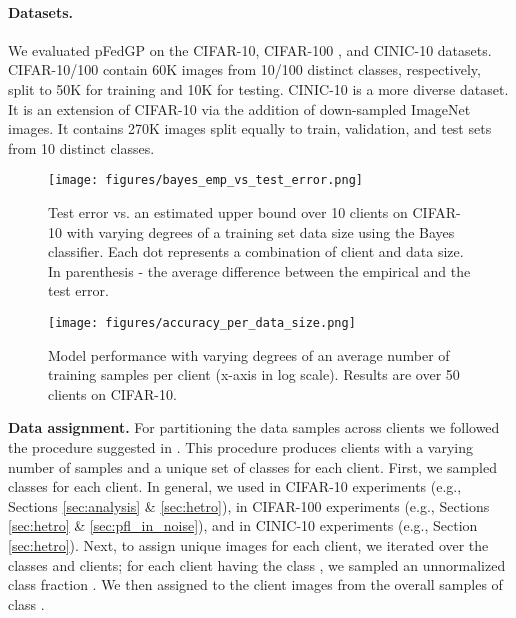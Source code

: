 \documentclass{article}
\begin{document}
\paragraph{Datasets.} We evaluated pFedGP on the CIFAR-10, CIFAR-100 \cite{krizhevsky2009learning}, and CINIC-10 \cite{darlow2018cinic} datasets. CIFAR-10/100 contain 60K images from 10/100 distinct classes, respectively, split to 50K for training and 10K for testing. CINIC-10 is a more diverse dataset. It is an extension of CIFAR-10 via the addition of down-sampled ImageNet \cite{deng2009imagenet} images. It contains 270K images split equally to train, validation, and test sets from 10 distinct classes.
\begin{figure}[!t]
    \centering
    \begin{minipage}{.45\textwidth}
        \centering
        \texttt{[image: figures/bayes\_emp\_vs\_test\_error.png]}
        \caption{Test error vs. an estimated upper bound over 10 clients on CIFAR-10 with varying degrees of a training set data size using the Bayes classifier. Each dot represents a combination of client and data size. In parenthesis - the average difference between the empirical and the test error.}
        \label{fig:gen_vs_test_error_bayes}
    \end{minipage}\hskip 1.0cm
    \begin{minipage}{0.45\textwidth}
        \vspace{-25pt}
        \centering
        \texttt{[image: figures/accuracy\_per\_data\_size.png]}
        \caption{Model performance with varying degrees of an average number of training samples per client (x-axis in log scale). Results are over 50 clients on CIFAR-10.}
        \label{fig:varying}
    \end{minipage}
\end{figure}

\textbf{Data assignment.} For partitioning the data samples across clients we followed the procedure suggested in \cite{shamsian2021personalized_icml, t2020personalized}. This procedure produces clients with a varying number of samples and a unique set of  classes for each client. First, we sampled  classes for each client. In general, we used  in CIFAR-10 experiments (e.g., Sections \ref{sec:analysis} \& \ref{sec:hetro}),  in CIFAR-100 experiments (e.g., Sections \ref{sec:hetro} \& \ref{sec:pfl_in_noise}), and  in CINIC-10 experiments (e.g., Section \ref{sec:hetro}). Next, to assign unique images for each client, we iterated over the classes and clients; for each client  having the class , we sampled an unnormalized class fraction . We then assigned to the  client  images from the overall samples of class .
\end{document}
